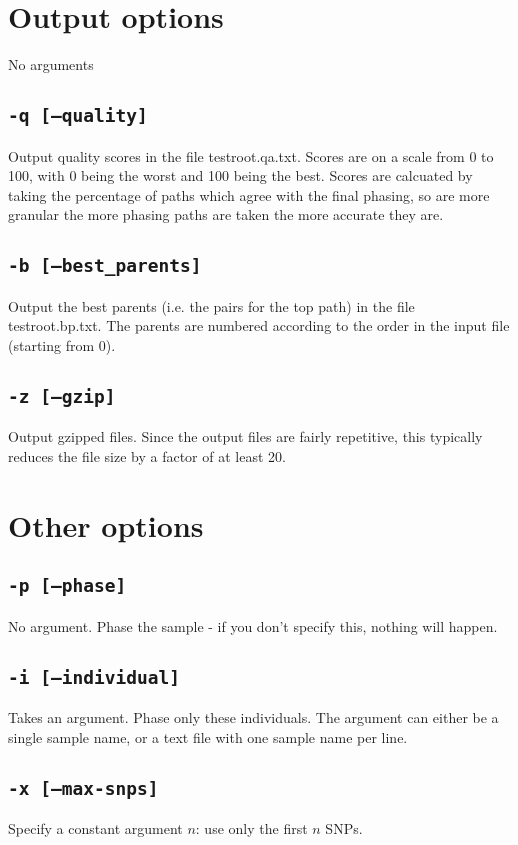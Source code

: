 \documentclass[10pt]{refart}
\begin{document}
\newpage
\section{Output options}
No arguments
\subsection{\texttt{-q [--quality]}}
Output quality scores in the file {testroot}.qa.txt. Scores are on a scale from 0 to 100, with 0 being the worst and 100 being the best. Scores are calcuated by taking the percentage of paths which agree with the final phasing, so are more granular the more phasing paths are taken the more accurate they are. 

\subsection{\texttt{-b [--best\_parents]}}
Output the best parents (i.e. the pairs for the top path) in the file {testroot}.bp.txt. The parents are numbered according to the order in the input file (starting from 0). 

\subsection{\texttt{-z [--gzip]}}
Output gzipped files. Since the output files are fairly repetitive, this typically reduces the file size by a factor of at least 20. 

\newpage

\section{Other options}
\subsection{\texttt{-p [--phase]}}
No argument. Phase the sample - if you don't specify this, nothing will happen.

\subsection{\texttt{-i [--individual]}}
Takes an argument. Phase only these individuals. The argument can either be a single sample name, or a text file with one sample name per line. 

\subsection{\texttt{-x [--max-snps]}}
Specify a constant argument $n$: use only the first $n$ SNPs.  
\end{document}
